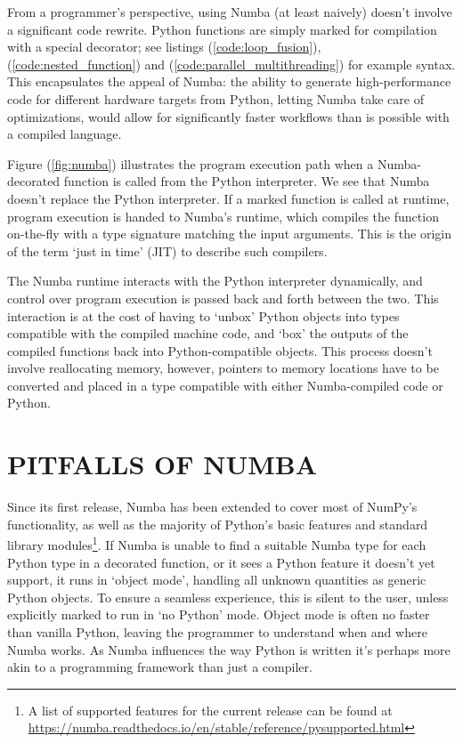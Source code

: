 \documentclass{IEEEcsmag}
\begin{document}
From a programmer's perspective, using Numba (at least naively) doesn't involve a significant code rewrite. Python functions are simply marked for compilation with a special decorator; see listings (\ref{code:loop_fusion}), (\ref{code:nested_function}) and (\ref{code:parallel_multithreading}) for example syntax. This encapsulates the appeal of Numba: the ability to generate high-performance code for different hardware targets from Python, letting Numba take care of optimizations, would allow for significantly faster workflows than is possible with a compiled language.

Figure (\ref{fig:numba}) illustrates the program execution path when a Numba-decorated function is called from the Python interpreter. We see that Numba doesn't replace the Python interpreter. If a marked function is called at runtime, program execution is handed to Numba's runtime, which compiles the function on-the-fly with a type signature matching the input arguments. This is the origin of the term `just in time' (JIT) to describe such compilers.

The Numba runtime interacts with the Python interpreter dynamically, and control over program execution is passed back and forth between the two. This interaction is at the cost of having to `unbox' Python objects into types compatible with the compiled machine code, and `box' the outputs of the compiled functions back into Python-compatible objects. This process doesn't involve reallocating memory, however, pointers to memory locations have to be converted and placed in a type compatible with either Numba-compiled code or Python.



\section{PITFALLS OF NUMBA}\label{sec:pitfalls}

Since its first release, Numba has been extended to cover most of NumPy's functionality, as well as the majority of Python's basic features and standard library modules\footnote{A list of supported features for the current release can be found at \url{https://numba.readthedocs.io/en/stable/reference/pysupported.html}}. If Numba is unable to find a suitable Numba type for each Python type in a decorated function, or it sees a Python feature it doesn't yet support, it runs in `object mode', handling all unknown quantities as generic Python objects. To ensure a seamless experience, this is silent to the user, unless explicitly marked to run in `no Python' mode. Object mode is often no faster than vanilla Python, leaving the programmer to understand when and where Numba works. As Numba influences the way Python is written it's perhaps more akin to a programming framework than just a compiler.
\end{document}
